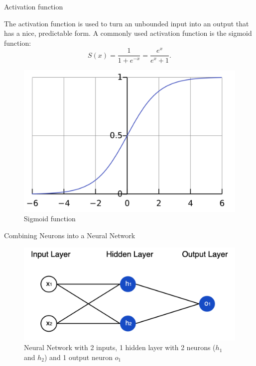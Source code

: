 \documentclass[11pt]{beamer}
\begin{document}
\begin{frame}{Activation function}



	  The activation function is used to turn an unbounded input into an output that has a nice, predictable form. A commonly used activation function is the sigmoid function:
	\begin{equation*}
	 S(x)={\frac {1}{1+e^{-x}}}={\frac {e^{x}}{e^{x}+1}}.
	\end{equation*}

		\begin{figure}
		\centering
		\includegraphics[scale=0.29]{sigmoid}
		\caption{Sigmoid function}
	\end{figure}		
	
\end{frame}

\begin{frame}{Combining Neurons into a Neural Network}
	\begin{figure}
	\centering
	\includegraphics[scale=0.49]{neuralnetwork}
	\caption{Neural Network with 2 inputs, 1 hidden layer with 2 neurons ($h_1$ and $h_2$) and 1 output neuron $o_1$ }
\end{figure}		
\end{frame}
\end{document}
